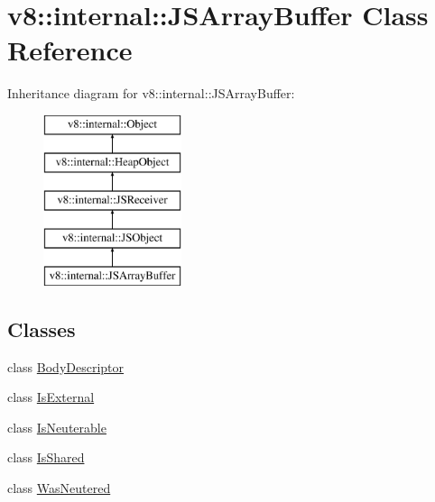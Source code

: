 \hypertarget{classv8_1_1internal_1_1_j_s_array_buffer}{}\section{v8\+:\+:internal\+:\+:J\+S\+Array\+Buffer Class Reference}
\label{classv8_1_1internal_1_1_j_s_array_buffer}
Inheritance diagram for v8\+:\+:internal\+:\+:J\+S\+Array\+Buffer\+:\begin{figure}[H]
\begin{center}
\leavevmode
\includegraphics[height=5.000000cm]{classv8_1_1internal_1_1_j_s_array_buffer}
\end{center}
\end{figure}
\subsection*{Classes}
\begin{DoxyCompactItemize}
\item 
class \hyperlink{classv8_1_1internal_1_1_j_s_array_buffer_1_1_body_descriptor}{Body\+Descriptor}
\item 
class \hyperlink{classv8_1_1internal_1_1_j_s_array_buffer_1_1_is_external}{Is\+External}
\item 
class \hyperlink{classv8_1_1internal_1_1_j_s_array_buffer_1_1_is_neuterable}{Is\+Neuterable}
\item 
class \hyperlink{classv8_1_1internal_1_1_j_s_array_buffer_1_1_is_shared}{Is\+Shared}
\item 
class \hyperlink{classv8_1_1internal_1_1_j_s_array_buffer_1_1_was_neutered}{Was\+Neutered}
\end{DoxyCompactItemize}
